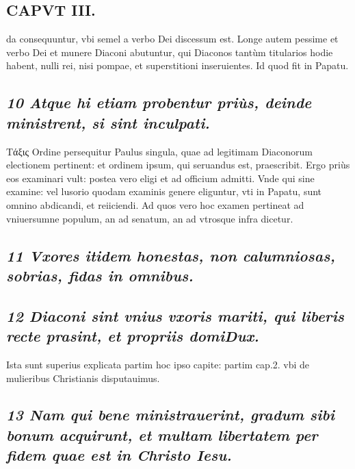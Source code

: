 \documentclass{article}
\begin{document}
\begin{pages}
\section*{CAPVT  III. }
\marginpar{[ p.165 ]}\pstart da consequuntur, vbi semel a verbo Dei discessum est.  \pend\pstart Longe autem pessime et verbo Dei et munere Diaconi abutuntur, qui Diaconos tantùm titularios hodie habent, nulli rei, nisi pompae, et superstitioni inseruientes. Id quod fit in Papatu.  \pend
{}
{}
\subsection*{\textit{10 Atque hi etiam probentur priùs, deinde ministrent, si sint inculpati. }}\pstart Τάξις Ordine persequitur Paulus singula, quae ad legitimam Diaconorum electionem pertinent: et ordinem ipsum, qui seruandus est, praescribit. Ergo priùs eos examinari vult: postea vero eligi et ad officium admitti. Vnde qui sine examine: vel lusorio quodam examinis genere eliguntur, vti in Papatu, sunt omnino abdicandi, et reiiciendi. Ad quos vero hoc examen pertineat ad vniuersumne populum, an ad senatum, an ad vtrosque infra dicetur.  \pend
{}
{}
\subsection*{\textit{11 Vxores itidem honestas, non calumniosas, sobrias, fidas in omnibus. }}
{}
\subsection*{\textit{12 Diaconi sint vnius vxoris mariti, qui liberis recte prasint, et propriis domiDux. }}\pstart Ista sunt superius explicata partim hoc ipso capite: partim cap.2. vbi de mulieribus Christianis disputauimus.  \pend
{}
{}
\subsection*{\textit{13 Nam qui bene ministrauerint, gradum sibi bonum acquirunt, et multam libertatem per fidem quae est in Christo Iesu. }}

\end{pages}
\end{document}
